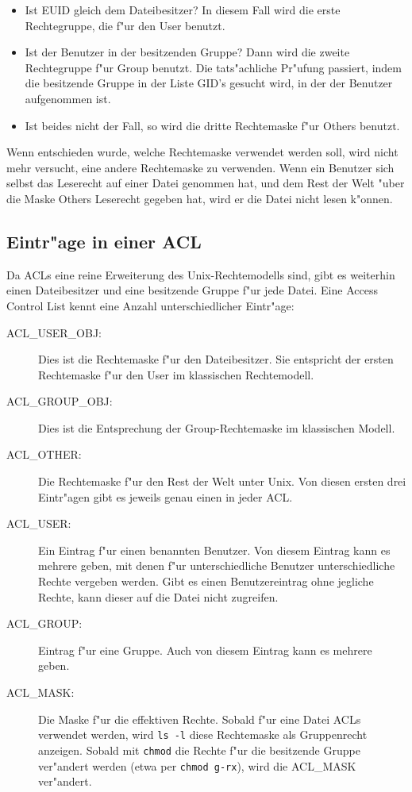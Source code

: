 \documentclass{scrartcl}\usepackage{pslatex}\typearea{12}
\newcommand{\prog}{\texttt}
\begin{document}
\begin{itemize}
\item Ist EUID gleich dem Dateibesitzer? In diesem Fall wird die erste
  Rechtegruppe, die f"ur den User benutzt.
\item Ist der Benutzer in der besitzenden Gruppe? Dann wird die zweite
  Rechtegruppe f"ur Group benutzt. Die tats"achliche Pr"ufung
  passiert, indem die besitzende Gruppe in der Liste GID's gesucht
  wird, in der der Benutzer aufgenommen ist.
\item Ist beides nicht der Fall, so wird die dritte Rechtemaske f"ur
  Others benutzt.
\end{itemize}

Wenn entschieden wurde, welche Rechtemaske verwendet werden soll, wird
nicht mehr versucht, eine andere Rechtemaske zu verwenden. Wenn ein
Benutzer sich selbst das Leserecht auf einer Datei genommen hat, und
dem Rest der Welt "uber die Maske Others Leserecht gegeben hat, wird
er die Datei nicht lesen k"onnen.

\subsection{Eintr"age in einer ACL}

Da ACLs eine reine Erweiterung des Unix-Rechtemodells sind, gibt es
weiterhin einen Dateibesitzer und eine besitzende Gruppe f"ur jede
Datei. Eine Access Control List kennt eine Anzahl unterschiedlicher
Eintr"age:

\begin{description}
\item[ACL\_USER\_OBJ:] Dies ist die Rechtemaske f"ur den
  Dateibesitzer. Sie entspricht der ersten Rechtemaske f"ur den User
  im klassischen Rechtemodell.
\item[ACL\_GROUP\_OBJ:] Dies ist die Entsprechung der
  Group-Rechtemaske im klassischen Modell.
\item[ACL\_OTHER:] Die Rechtemaske f"ur den Rest der Welt unter Unix.
  Von diesen ersten drei Eintr"agen gibt es jeweils genau einen in
  jeder ACL.
\item[ACL\_USER:] Ein Eintrag f"ur einen benannten Benutzer.  Von
  diesem Eintrag kann es mehrere geben, mit denen f"ur
  unterschiedliche Benutzer unterschiedliche Rechte vergeben werden.
  Gibt es einen Benutzereintrag ohne jegliche Rechte, kann dieser auf
  die Datei nicht zugreifen.
\item[ACL\_GROUP:] Eintrag f"ur eine Gruppe. Auch von diesem Eintrag
  kann es mehrere geben.
\item[ACL\_MASK:] Die Maske f"ur die effektiven Rechte. Sobald f"ur
  eine Datei ACLs verwendet werden, wird \prog{ls -l} diese
  Rechtemaske als Gruppenrecht anzeigen. Sobald mit \prog{chmod} die
  Rechte f"ur die besitzende Gruppe ver"andert werden (etwa per
  \prog{chmod g-rx}), wird die ACL\_MASK ver"andert.
\end{description}
\end{document}
